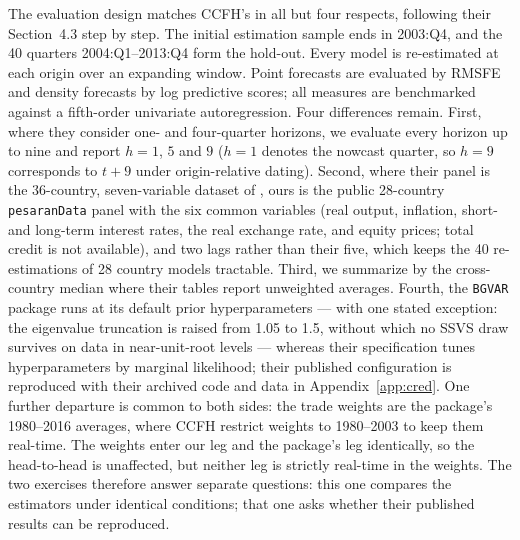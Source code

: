The evaluation design matches CCFH's in all but four respects, following their
Section~4.3 step by step. The initial estimation sample ends in 2003:Q4, and the 40 quarters
2004:Q1--2013:Q4 form the hold-out. Every model is re-estimated at each origin over an
expanding window. Point forecasts are evaluated by RMSFE and density
forecasts by log predictive scores; all measures are benchmarked against a fifth-order
univariate autoregression. Four differences remain. First, where they consider one- and
four-quarter horizons, we evaluate every horizon up to nine and report $h=1$, $5$ and $9$
($h=1$ denotes the nowcast quarter, so $h=9$ corresponds to $t+9$ under origin-relative
dating). Second, where their panel is the 36-country, seven-variable dataset of
\citet{DovernFeldkircherHuber2015}, ours is the public 28-country \texttt{pesaranData}
panel with the six common variables (real output, inflation, short- and long-term
interest rates, the real exchange rate, and equity prices; total credit is not
available), and two lags rather than their five, which keeps the 40 re-estimations of 28
country models tractable. Third, we summarize by the cross-country median where their
tables report unweighted averages. Fourth, the \texttt{BGVAR} package runs at its default
prior hyperparameters --- with one stated exception: the eigenvalue truncation is raised
from 1.05 to 1.5, without which no SSVS draw survives on data in near-unit-root levels
--- whereas their specification tunes hyperparameters by marginal likelihood; their
published configuration is reproduced with their archived code and data in
Appendix~\ref{app:cred}. One further departure is common to both sides: the trade
weights are the package's 1980--2016 averages, where CCFH restrict weights to
1980--2003 to keep them real-time. The weights enter our leg and the package's leg
identically, so the head-to-head is unaffected, but neither leg is strictly real-time in
the weights. The two exercises therefore answer separate questions: this
one compares the estimators under identical conditions; that one asks whether their
published results can be reproduced.

\begin{table}[t]
\centering
\caption{Point-forecast accuracy on the CCFH design: relative RMSFE against the AR(5)
benchmark, median across the 28 \texttt{pesaranData} countries (40 origins, 2004--2013,
re-estimated at every origin). A dagger marks cells whose summed log predictive score
exceeds that of the AR(5). ``+anch.''\ applies the long-run targets of
Section~\ref{sec:anchors}: drift targets for trending log-levels, the recursive
as-of-origin mean for inflation, and, for the interest rates, the forward-rate path
implied by each origin's own yield curve under the expectations hypothesis (see text). No
future information enters any target. The SSVS and MN columns run the \texttt{BGVAR}
package at default hyperparameters; RW is the last-observation random walk, point-scored
only.}
\label{tab:ccfhmatrix}
\footnotesize\setlength{\tabcolsep}{3pt}
\begin{center}

\end{center}
\end{table}

